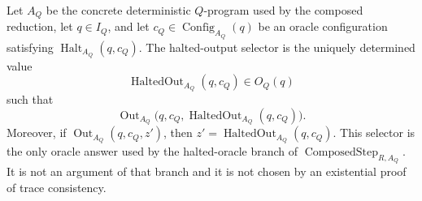 \begin{definition}
  \label{def:oracle-halted-output-selector}
  Let $A_Q$ be the concrete deterministic $Q$-program used by the composed
  reduction, let $q\in I_Q$, and let
  $c_Q\in\operatorname{Config}_{A_Q}(q)$ be an oracle configuration satisfying
  $\operatorname{Halt}_{A_Q}(q,c_Q)$.  The halted-output selector is the
  uniquely determined value
  \[
    \operatorname{HaltedOut}_{A_Q}(q,c_Q)\in O_Q(q)
  \]
  such that
  \[
    \operatorname{Out}_{A_Q}
      \bigl(q,c_Q,\operatorname{HaltedOut}_{A_Q}(q,c_Q)\bigr).
  \]
  Moreover, if $\operatorname{Out}_{A_Q}(q,c_Q,z')$, then
  $z'=\operatorname{HaltedOut}_{A_Q}(q,c_Q)$.  This selector is the only
  oracle answer used by the halted-oracle branch of
  $\operatorname{ComposedStep}_{R,A_Q}$.  It is not an argument of that branch
  and it is not chosen by an existential proof of trace consistency.
\end{definition}

